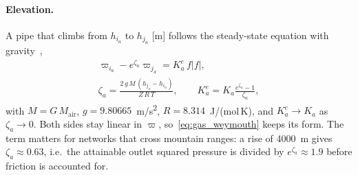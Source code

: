 \paragraph{Elevation.}
A pipe that climbs from $h_{i_a}$ to $h_{j_a}$ [m] follows the
steady-state equation with gravity~\cite[\S 2.9]{menon2005gas},
\begin{gather}
\varpi_{i_a} - e^{\zeta_a}\varpi_{j_a} = K^e_a\, f|f|,
\label{eq:gas_elevation} \\
\zeta_a = \frac{2\,g\,M\,(h_{j_a} - h_{i_a})}{Z\,R\,T},
\qquad
K^e_a = K_a \frac{e^{\zeta_a} - 1}{\zeta_a},
\nonumber
\end{gather}
with $M = G\, M_{\mathrm{air}}$, $g = 9.80665$~m/s\textsuperscript{2},
$R = 8.314$~J/(mol\,K), and $K^e_a \to K_a$ as $\zeta_a \to 0$.  Both
sides stay linear in $\varpi$, so~\eqref{eq:gas_weymouth} keeps its
form.  The term matters for networks that cross mountain ranges: a
rise of 4000~m gives $\zeta_a \approx 0.63$, i.e.\ the attainable
outlet squared pressure is divided by $e^{\zeta_a} \approx 1.9$ before
friction is accounted for.


